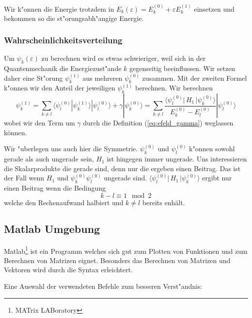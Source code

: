 \begin{refsection}
Wir k"onnen die Energie trotzdem in
$E_k(\varepsilon)=E_k^{(0)} + \varepsilon E_k^{(1)}$ einsetzen
und bekommen so die st"orungsabh"angige Energie.






\subsubsection{Wahrscheinlichkeitsverteilung}

Um $\psi_k(\varepsilon)$ zu berechnen wird es etwas schwieriger,
weil sich in der Quantenmechanik die Energiezust"ande $k$ gegenseitig beeinflussen.
Wir setzen daher eine St"orung $\psi_k^{(1)}$ aus mehreren $\psi_k^{(0)}$ zusammen.
Mit der zweiten Formel k"onnen wir den Anteil der jeweiligen $\psi_k^{(1)}$ berechnen.
Wir berechnen 
\[
\psi_k^{(1)} =
\sum_{k\ne l}
\langle\psi_l^{(0)}|\psi_k^{(1)}\rangle |\psi_l^{(0)}\rangle + \gamma|\psi_k^{(0)}\rangle
=
\sum_{k\ne l}
\frac{\langle \psi_l^{(0)}|\, H_1 \,|\psi_k^{(0)}\rangle}{E_k^{(0)}-E_l^{(0)}} |\psi_l^{(0)}\rangle
\]
wobei wir den Term um $\gamma$ durch die Definition (\ref{eq:efeld_gamma}) weglassen k\"onnen.

Wir "uberlegen uns auch hier die Symmetrie.
$\psi_k^{(0)}$ und $\psi_l^{(0)}$ k"onnen sowohl gerade als auch ungerade sein,
$H_1$ ist hingegen immer ungerade.
Uns interessieren die Skalarprodukte die gerade sind, denn nur die ergeben einen Beitrag.
Das ist der Fall wenn $H_1$ und $\psi_k^{(0)} \psi_l^{(0)}$ ungerade sind.
$\langle \psi_l^{(0)}|\, H_1 \,|\psi_k^{(0)}\rangle$ ergibt nur einen Beitrag wenn die Bedingung
\begin{equation}
  \label{eq:efeld_summebedingung}
  k-l \equiv 1 \mod 2
\end{equation}
welche den Rechenaufwand halbiert und $k \ne l$ bereits enh\"alt.



\subsection{Matlab Umgebung}

Matlab\footnote{MATrix LABoratory} ist ein Programm welches sich gut zum Plotten von Funktionen
und zum Berechnen von Matrizen eignet.
Besonders das Berechnen von Matrizen und Vektoren wird durch die Syntax erleichtert.

Eine Auswahl der verwendeten Befehle zum besseren Verst"andnis:


\end{refsection}
